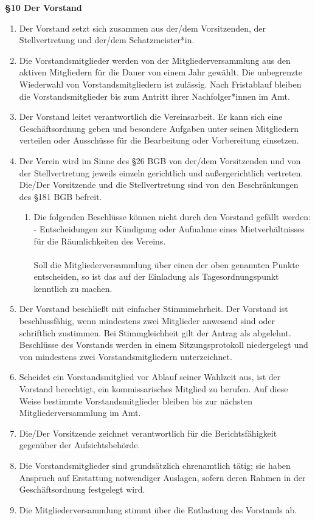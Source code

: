 \documentclass[a4paper,
               12pt,
               titlepage,
               parskip=half]{scrartcl}
\begin{document}
\textbf{§10 Der Vorstand}
{\small
	\begin{enumerate}
		\item Der Vorstand setzt sich zusammen aus der/dem Vorsitzenden, der Stellvertretung und der/dem Schatzmeister*in.
		\item Die Vorstandsmitglieder werden von der Mitgliederversammlung aus den aktiven Mitgliedern für die Dauer von einem Jahr gewählt. Die unbegrenzte Wiederwahl von Vorstandsmitgliedern ist zulässig. Nach Fristablauf bleiben die Vorstandsmitglieder bis zum Antritt ihrer Nachfolger*innen im Amt.
		\item Der Vorstand leitet verantwortlich die Vereinsarbeit. Er kann sich eine Geschäftsordnung geben und besondere Aufgaben unter seinen Mitgliedern verteilen oder Ausschüsse für die Bearbeitung oder Vorbereitung einsetzen.
		\item Der Verein wird im Sinne des §26 BGB von der/dem Vorsitzenden und von der Stellvertretung jeweils einzeln gerichtlich und außergerichtlich vertreten. Die/Der Vorsitzende und die Stellvertretung sind von den Beschränkungen des §181 BGB befreit.
		\begin{enumerate}[label=\arabic{enumi}\alph*.,leftmargin=0.0in]
			\item Die folgenden Beschlüsse können nicht durch den Vorstand gefällt werden:\\
			- Entscheidungen zur Kündigung oder Aufnahme eines Mietverhältnisses für die Räumlichkeiten des Vereins.\\\\
			Soll die Mitgliederversammlung über einen der oben genannten Punkte entscheiden, so
			ist das auf der Einladung als Tagesordnungspunkt kenntlich zu machen.
	    \end{enumerate}
    	\item Der Vorstand beschließt mit einfacher Stimmmehrheit. Der Vorstand ist beschlussfähig, wenn mindestens zwei Mitglieder anwesend sind oder schriftlich zustimmen. Bei Stimmgleichheit gilt der Antrag als abgelehnt. Beschlüsse des Vorstands werden in einem Sitzungsprotokoll niedergelegt und von mindestens zwei Vorstandsmitgliedern unterzeichnet.
    	\item Scheidet ein Vorstandsmitglied vor Ablauf seiner Wahlzeit aus, ist der Vorstand berechtigt, ein kommissarisches Mitglied zu berufen. Auf diese Weise bestimmte Vorstandsmitglieder bleiben bis zur nächsten Mitgliederversammlung im Amt.
    	\item Die/Der Vorsitzende zeichnet verantwortlich für die Berichtsfähigkeit gegenüber der Aufsichtsbehörde.
    	\item Die Vorstandsmitglieder sind grundsätzlich ehrenamtlich tätig; sie haben Anspruch auf Erstattung notwendiger Auslagen, sofern deren Rahmen in der Geschäftsordnung festgelegt wird.
    	\item Die Mitgliederversammlung stimmt über die Entlastung des Vorstands ab.
	\end{enumerate}
}
\end{document}
